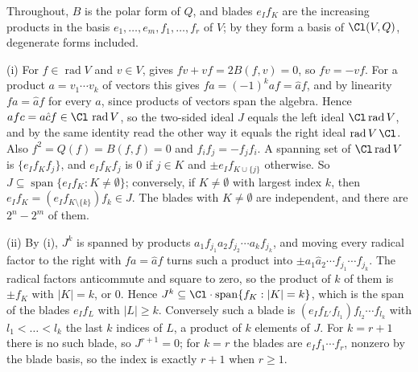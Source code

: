 Throughout, $B$ is the polar form of $Q$, and blades $e_I f_K$ are the increasing products in the basis $e_1, \dots, e_m, f_1, \dots, f_r$ of $V$; by  they form a basis of $\Cl(V, Q)$, degenerate forms included.

(i) For $f \in \operatorname{rad} V$ and $v \in V$,  gives $fv + vf = 2B(f, v) = 0$, so $f v = -v f$. For a product $a = v_1 \cdots v_k$ of vectors this gives $f a = (-1)^{k} a f = \hat{a} f$, and by linearity $f a = \hat{a} f$ for every $a$, since products of vectors span the algebra. Hence $a f c = a \hat{c} f \in \Cl\, \operatorname{rad} V$, so the two-sided ideal $J$ equals the left ideal $\Cl \operatorname{rad} V$, and by the same identity read the other way it equals the right ideal $\operatorname{rad} V\, \Cl$. Also $f^{2} = Q(f) = B(f, f) = 0$ and $f_i f_j = -f_j f_i$. A spanning set of $\Cl \operatorname{rad} V$ is $\{e_I f_K f_j\}$, and $e_I f_K f_j$ is $0$ if $j \in K$ and $\pm e_I f_{K \cup \{j\}}$ otherwise. So $J \subseteq \operatorname{span}\{e_I f_K : K \ne \emptyset\}$; conversely, if $K \ne \emptyset$ with largest index $k$, then $e_I f_K = (e_I f_{K \setminus \{k\}}) f_k \in J$. The blades with $K \ne \emptyset$ are independent, and there are $2^{n} - 2^{m}$ of them.

(ii) By (i), $J^{k}$ is spanned by products $a_1 f_{j_1} a_2 f_{j_2} \cdots a_k f_{j_k}$, and moving every radical factor to the right with $f a = \hat a f$ turns such a product into $\pm a_1 \hat a_2 \cdots f_{j_1} \cdots f_{j_k}$. The radical factors anticommute and square to zero, so the product of $k$ of them is $\pm f_K$ with $\lvert K \rvert = k$, or $0$. Hence $J^{k} \subseteq \Cl \cdot \operatorname{span}\{f_K : \lvert K \rvert = k\}$, which is the span of the blades $e_I f_L$ with $\lvert L \rvert \ge k$. Conversely such a blade is $(e_I f_{L'} f_{l_1}) f_{l_2} \cdots f_{l_k}$ with $l_1 < \dots < l_k$ the last $k$ indices of $L$, a product of $k$ elements of $J$. For $k = r + 1$ there is no such blade, so $J^{r+1} = 0$; for $k = r$ the blades are $e_I f_1 \cdots f_r$, nonzero by the blade basis, so the index is exactly $r + 1$ when $r \ge 1$.

